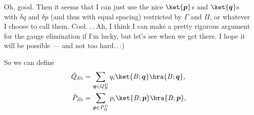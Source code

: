 \documentclass{report}
\begin{document}
Oh, good. Then it seems that I can just use the nice $\ket{\boldsymbol{p}}$s and $\ket{\boldsymbol{q}}$s with $\delta q$ and $\delta p$ (and thus with equal spacing) restricted by $\Gamma$ and $\Pi$, or whatever I choose to call them. Cool. .\,.\,Ah, I think I can make a pretty rigorous argument for the gauge elimination if I'm lucky, but let's see when we get there. I hope it will be possible --- and not too hard.\,.\,:) 

So we can define
\begin{align}
\begin{aligned}
	\hat Q_{B i} =&\, \sum_{\boldsymbol{q} \in Q_{B}^D} 
		q_{i} \ket{B; \boldsymbol{q}} \bra{B; \boldsymbol{q}}, \\
	\hat P_{B i} =&\, \sum_{\boldsymbol{p} \in P_{B}^D} 
		p_{i} \ket{B; \boldsymbol{p}} \bra{B; \boldsymbol{p}},
\end{aligned}
\end{align} 
\end{document}
